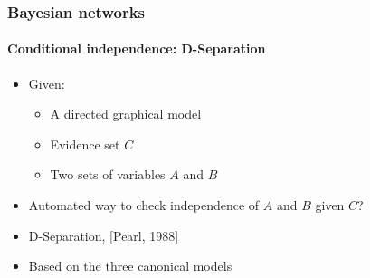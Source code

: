 \documentclass[slidestop,compress,mathserif]{beamer}
\begin{document}
\begin{frame}
	\frametitle{Bayesian networks}
	\framesubtitle{Conditional independence: D-Separation}
    \begin{itemize}
    \item Given:
        \begin{itemize}
        \item A directed graphical model
        \item Evidence set $C$
        \item Two sets of variables $A$ and $B$
        \end{itemize} 
    \item Automated way to check independence of $A$ and $B$ given $C$?
    \item D-Separation, [Pearl, 1988]
    \item Based on the three canonical models
    \end{itemize} 
\end{frame}
\end{document}
